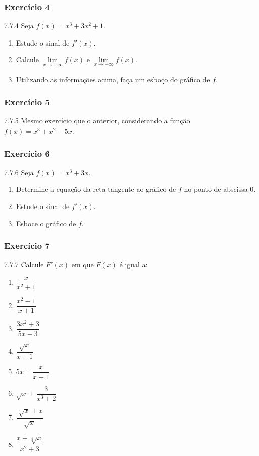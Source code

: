 \subsubsection*{Exercício 4}
\begin{exercicio}[4]{7.7.4}
Seja $f(x) = x^3 + 3x^2 + 1$.
\begin{enumerate}[label=\alph*)]
    \item Estude o sinal de $f'(x)$.
    \item Calcule $\lim\limits_{x \to +\infty} f(x)$ e $\lim\limits_{x \to -\infty} f(x)$.
    \item Utilizando as informações acima, faça um esboço do gráfico de $f$.
\end{enumerate}
\end{exercicio}

\subsubsection*{Exercício 5}
\begin{exercicio}[5]{7.7.5}
Mesmo exercício que o anterior, considerando a função $f(x) = x^3 + x^2 - 5x$.
\end{exercicio}

\subsubsection*{Exercício 6}
\begin{exercicio}[6]{7.7.6}
Seja $f(x) = x^3 + 3x$.
\begin{enumerate}[label=\alph*)]
    \item Determine a equação da reta tangente ao gráfico de $f$ no ponto de abscissa 0.
    \item Estude o sinal de $f'(x)$.
    \item Esboce o gráfico de $f$.
\end{enumerate}
\end{exercicio}

\subsubsection*{Exercício 7}
\begin{exercicio}[7]{7.7.7}
Calcule $F'(x)$ em que $F(x)$ é igual a:
\begin{enumerate}[label=\alph*)]
    \item $\dfrac{x}{x^2 + 1}$
    \item $\dfrac{x^2 - 1}{x + 1}$
    \item $\dfrac{3x^2 + 3}{5x - 3}$
    \item $\dfrac{\sqrt{x}}{x + 1}$
    \item $5x + \dfrac{x}{x - 1}$
    \item $\sqrt{x} + \dfrac{3}{x^3 + 2}$
    \item $\dfrac{\sqrt[3]{x} + x}{\sqrt{x}}$
    \item $\dfrac{x + \sqrt[4]{x}}{x^2 + 3}$
\end{enumerate}
\end{exercicio}


